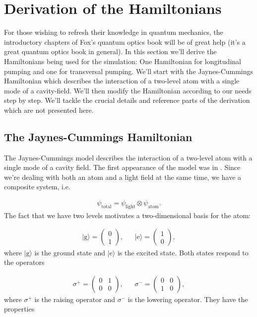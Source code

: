 \section{Derivation of the Hamiltonians}
For those wishing to refresh their knowledge in quantum mechanics, the introductory chapters of Fox's quantum optics book will be of great help \cite{fox} (it's a great quantum optics book in general). In this section we'll derive the Hamiltonians being used for the simulation: One Hamiltonian for longitudinal pumping and one for transversal pumping. We'll start with the Jaynes-Cummings Hamiltonian which describes the interaction of a two-level atom with a single mode of a cavity-field. We'll then modify the Hamiltonian according to our needs step by step. We'll tackle the crucial details and reference parts of the derivation which are not presented here.

\subsection{The Jaynes-Cummings Hamiltonian}
The Jaynes-Cummings model describes the interaction of a two-level atom with a single mode of a cavity field. The first appearance of the model was in \cite{jaynes}. Since we're dealing with both an atom and a light field at the same time, we have a composite system, i.e.

\begin{align}
\psi_\text{total} = \psi_\text{light} \otimes \psi_\text{atom}.
\end{align}The fact that we have two levels motivates a two-dimensional basis for the atom:

\begin{align}
|\text{g}\rangle = \begin{pmatrix}0 \\ 1\end{pmatrix}, && |\text{e}\rangle = \begin{pmatrix}1 \\ 0\end{pmatrix},
\end{align}where $|\text{g}\rangle$ is the ground state and $|\text{e}\rangle$ is the excited state. Both states respond to the operators

\begin{align}
\sigma^+ = \begin{pmatrix}0 & 1 \\ 0 & 0\end{pmatrix}, && \sigma^- = \begin{pmatrix}0 & 0 \\ 1 & 0\end{pmatrix},
\end{align}where $\sigma^+$ is the raising operator and $\sigma^-$ is the lowering operator. They have the properties

